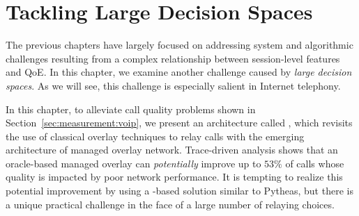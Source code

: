 \chapter{Tackling Large Decision Spaces}
\label{ch:via}



\providecommand{\ControlPlane}{{video optimization system}\xspace}
\providecommand{\mdn}{{MDN}\xspace}
\providecommand{\managed}{{managed overlay network}\xspace}
\providecommand{\Managed}{{Managed overlay network}\xspace}
\providecommand{\voip}{{audio conference application}\xspace}
\providecommand{\Voip}{{Audio conference application}\xspace}


\providecommand{\skype}{{Skype}\xspace}
\providecommand{\azure}{{ABC}\xspace}
\providecommand{\direct}{{default}\xspace}
\providecommand{\option}{{relaying option}\xspace}
\providecommand{\options}{{relaying options}\xspace}


The previous chapters have largely focused on addressing 
system and algorithmic challenges resulting from a complex relationship between 
session-level features and QoE.
In this chapter, we examine another
challenge caused by {\em large decision spaces}.
As we will see, this challenge is especially salient in Internet telephony.

In this chapter, to alleviate call quality problems shown in Section~\ref{sec:measurement:voip},
we present an architecture called \hybrid, which revisits the use of 
classical overlay techniques to relay calls with the emerging architecture of
managed overlay network. 
Trace-driven analysis shows that an oracle-based managed overlay can
{\em potentially} improve up to $53\%$ of calls whose quality 
is impacted by poor network performance. 
It is tempting to realize this potential improvement by using a \ddn-based
solution similar to Pytheas, but there is a unique practical challenge 
in the face of  a large number of relaying choices. 

